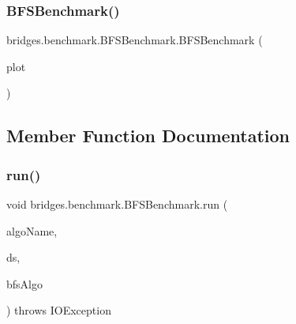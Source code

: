 \mbox{\label{classbridges_1_1benchmark_1_1_b_f_s_benchmark_afe4a4dd46295e41c1cb7ee25c616a2c9}} 
\subsubsection{\texorpdfstring{B\+F\+S\+Benchmark()}{BFSBenchmark()}\hspace{0.1cm}{\footnotesize\ttfamily [2/2]}}
{\footnotesize\ttfamily bridges.\+benchmark.\+B\+F\+S\+Benchmark.\+B\+F\+S\+Benchmark (\begin{DoxyParamCaption}\item[{\hyperlink{classbridges_1_1base_1_1_line_chart}{Line\+Chart}}]{plot }\end{DoxyParamCaption})}



\subsection{Member Function Documentation}
\mbox{\label{classbridges_1_1benchmark_1_1_b_f_s_benchmark_a4f8065c05f80164bc981c038a35996eb}} 
\subsubsection{\texorpdfstring{run()}{run()}}
{\footnotesize\ttfamily void bridges.\+benchmark.\+B\+F\+S\+Benchmark.\+run (\begin{DoxyParamCaption}\item[{String}]{algo\+Name,  }\item[{\hyperlink{classbridges_1_1connect_1_1_data_source}{Data\+Source}}]{ds,  }\item[{Consumer$<$ \hyperlink{classbridges_1_1benchmark_1_1_b_f_s_params}{B\+F\+S\+Params} $>$}]{bfs\+Algo }\end{DoxyParamCaption}) throws I\+O\+Exception}



